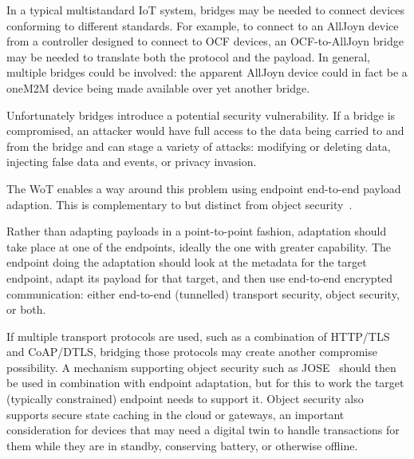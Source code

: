 In a typical multistandard IoT system,
bridges may be needed to connect devices
conforming to different standards.
For example,
to connect to an AllJoyn device from a controller
designed to connect to OCF devices, an OCF-to-AllJoyn bridge
may be needed to translate both the protocol and the payload.
In general, multiple bridges could be involved: the
apparent AllJoyn device could in fact be a oneM2M device
being made available over yet another bridge.

Unfortunately bridges introduce a potential security vulnerability.
If a bridge is compromised,
an attacker would have full access to the
data being carried to and from the bridge and can stage a 
variety of attacks: 
modifying or deleting data,
injecting false data and events,
or privacy invasion.

The WoT enables a way around this problem using endpoint 
end-to-end payload adaption.
This is complementary to but distinct from object security~\cite{Mattsson2014}.

Rather than adapting payloads in a point-to-point fashion,
adaptation should take place at one of the endpoints, ideally the
one with greater capability.  The endpoint doing the adaptation should
look at the metadata for the target endpoint, adapt its payload for that
target, and then use end-to-end encrypted communication:
either end-to-end (tunnelled) transport security, object security, or both.

If multiple transport protocols are used, such as a 
combination of HTTP/TLS and CoAP/DTLS, bridging those protocols
may create another compromise possibility.  A mechanism supporting
object security such as JOSE~\cite{Jose2014} should then be used
in combination with endpoint adaptation, but for this to
work the target (typically constrained) endpoint needs to support it. 
Object security also supports secure state caching in the cloud or gateways,
an important consideration for devices that may need a digital
twin to handle transactions for them while they are in standby,
conserving battery, or otherwise offline.

